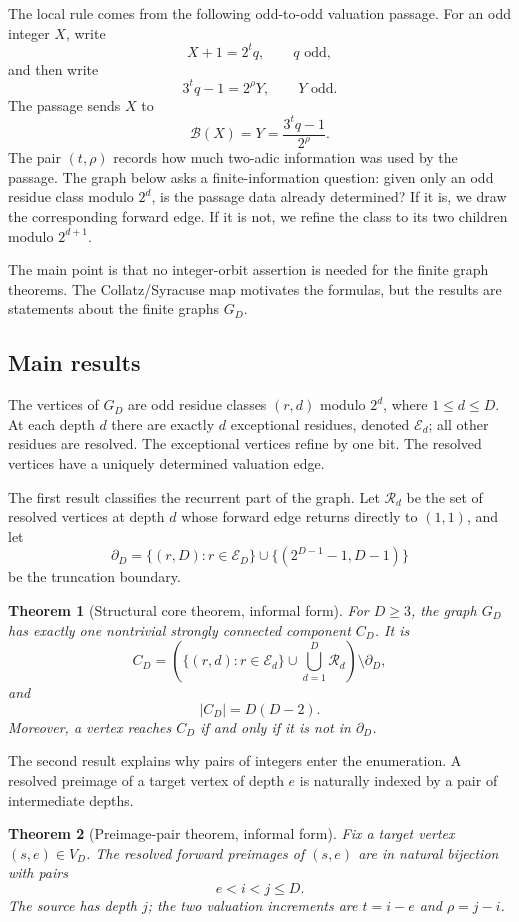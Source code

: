 \documentclass[11pt]{article}
\newtheorem{theorem}{Theorem}[section]
\theoremstyle{definition}
\theoremstyle{remark}
\newcommand{\Ecal}{\mathcal E}
\newcommand{\Rcal}{\mathcal R}
\newcommand{\bdD}{\partial_D}
\newcommand{\Bmap}{\mathcal B}
\begin{document}
The local rule comes from the following odd-to-odd valuation passage.  For an odd integer $X$, write
\[
X+1=2^tq,
\qquad q\text{ odd},
\]
and then write
\[
3^tq-1=2^\rho Y,
\qquad Y\text{ odd}.
\]
The passage sends $X$ to
\[
\Bmap(X)=Y=\frac{3^tq-1}{2^\rho}.
\]
The pair $(t,\rho)$ records how much two-adic information was used by the passage.  The graph below asks a finite-information question: given only an odd residue class modulo $2^d$, is the passage data already determined?  If it is, we draw the corresponding forward edge.  If it is not, we refine the class to its two children modulo $2^{d+1}$.

The main point is that no integer-orbit assertion is needed for the finite graph theorems.  The Collatz/Syracuse map motivates the formulas, but the results are statements about the finite graphs $G_D$.

\subsection{Main results}

The vertices of $G_D$ are odd residue classes $(r,d)$ modulo $2^d$, where $1\le d\le D$.  At each depth $d$ there are exactly $d$ exceptional residues, denoted $\Ecal_d$; all other residues are resolved.  The exceptional vertices refine by one bit.  The resolved vertices have a uniquely determined valuation edge.

The first result classifies the recurrent part of the graph.  Let $\Rcal_d$ be the set of resolved vertices at depth $d$ whose forward edge returns directly to $(1,1)$, and let
\[
\bdD=
\{(r,D):r\in\Ecal_D\}
\cup
\{(2^{D-1}-1,D-1)\}
\]
be the truncation boundary.

\begin{theorem}[Structural core theorem, informal form]
For $D\ge 3$, the graph $G_D$ has exactly one nontrivial strongly connected component $C_D$.  It is
\[
C_D=
\left(
\{(r,d):r\in\Ecal_d\}
\cup
\bigcup_{d=1}^D\Rcal_d
\right)\setminus\bdD,
\]
and
\[
|C_D|=D(D-2).
\]
Moreover, a vertex reaches $C_D$ if and only if it is not in $\bdD$.
\end{theorem}

The second result explains why pairs of integers enter the enumeration.  A resolved preimage of a target vertex of depth $e$ is naturally indexed by a pair of intermediate depths.

\begin{theorem}[Preimage-pair theorem, informal form]
Fix a target vertex $(s,e)\in V_D$.  The resolved forward preimages of $(s,e)$ are in natural bijection with pairs
\[
e<i<j\le D.
\]
The source has depth $j$; the two valuation increments are $t=i-e$ and $\rho=j-i$.
\end{theorem}
\end{document}
